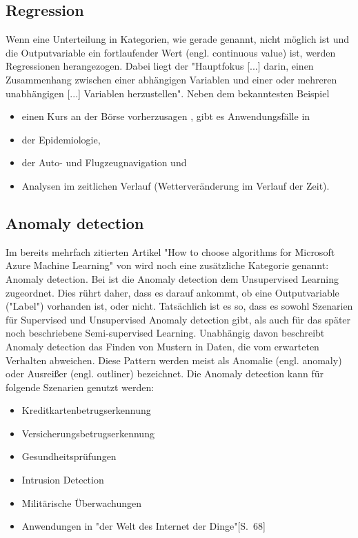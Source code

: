 \subsection{Regression}\label{subsubsec:regression}
Wenn eine Unterteilung in Kategorien, wie gerade genannt, nicht möglich ist und die Outputvariable ein fortlaufender Wert (engl. continuous value) ist, werden Regressionen herangezogen. Dabei liegt der "Hauptfokus [...] darin, einen Zusammenhang zwischen einer abhängigen Variablen und einer oder mehreren unabhängigen [...] Variablen herzustellen"\citep[S.~60; eigene Übersetzung]{swamynathan_mastering_2017}. Neben dem bekanntesten Beispiel
\begin{itemize}
\item einen Kurs an der Börse vorherzusagen , gibt es Anwendungsfälle in
\item der Epidemiologie,
\item der Auto- und Flugzeugnavigation und
\item Analysen im zeitlichen Verlauf (Wetterveränderung im Verlauf der Zeit)\citep[S.~5]{kauchak_neural_2016}.
\end{itemize}

\subsection{Anomaly detection}
Im bereits mehrfach zitierten Artikel "How to choose algorithms for Microsoft Azure Machine Learning" von \citep{ericson_how_2017} wird noch eine zusätzliche Kategorie genannt: Anomaly detection. Bei \citep[S.~68]{swamynathan_mastering_2017} ist die Anomaly detection dem Unsupervised Learning zugeordnet. Dies rührt daher, dass es darauf ankommt, ob eine Outputvariable ("Label") vorhanden ist, oder nicht. Tatsächlich ist es so, dass es sowohl Szenarien für Supervised und Unsupervised Anomaly detection gibt, als auch für das später noch beschriebene Semi-supervised Learning.\citep[S.~15:10]{chandola_anomaly_2009}
Unabhängig davon beschreibt Anomaly detection das Finden von Mustern in Daten, die vom erwarteten Verhalten abweichen. Diese Pattern werden meist als Anomalie (engl. anomaly) oder Ausreißer (engl. outliner) bezeichnet.\citep[S.~15:1]{chandola_anomaly_2009}
Die Anomaly detection kann für folgende Szenarien genutzt werden\citep[S.~15:2]{chandola_anomaly_2009}:
\begin{itemize}
\item Kreditkartenbetrugserkennung
\item Versicherungsbetrugserkennung
\item Gesundheitsprüfungen
\item Intrusion Detection
\item Militärische Überwachungen
\item Anwendungen in "der Welt des Internet der Dinge"[S.~68]\citep{swamynathan_mastering_2017}
\end{itemize}

